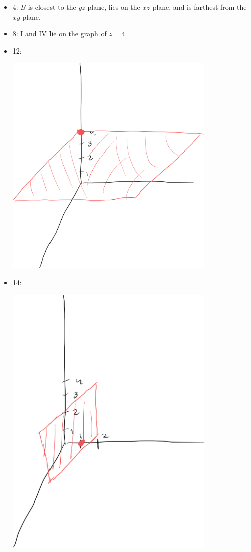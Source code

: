 \documentclass[9pt]{extarticle}
\title{}
\author{Avinash Iyer}
\date{}
\begin{document}
  \begin{problem}{12.1}
    \begin{itemize}
      \item 4: $B$ is closest to the $yz$ plane, lies on the $xz$ plane, and is farthest from the $xy$ plane.
      \item 8: I and IV lie on the graph of $z=4$.
      \item 12:
        \begin{center}
          \includegraphics[width=10cm]{12_1_12}
        \end{center}
      \item 14:
        \begin{center}
          \includegraphics[width=10cm]{12_1_14}

\end{center}
\end{itemize}
\end{problem}
\end{document}
